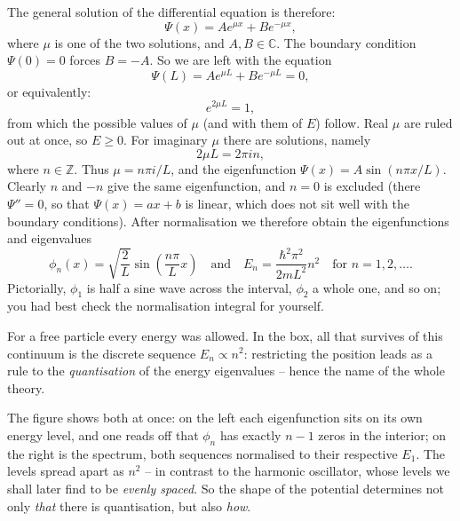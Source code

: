 The general solution of the differential equation is therefore: 
\begin{equation}
	\Psi(x) = A e^{\mu x} + B e^{-\mu x},
\end{equation}
where $\mu$ is one of the two solutions, and $A,B \in \mathbb{C}$. The boundary condition $\Psi(0)= 0$ forces $B = -A$. So we are left with the equation 
\begin{equation}
	\Psi(L) =A e^{\mu L} + B e^{-\mu L} = 0,
\end{equation}
or equivalently: 
\begin{equation}
	e^{2\mu L} = 1,
\end{equation}
from which the possible values of $\mu$ (and with them of $E$) follow. Real $\mu$ are ruled out at once,
so $E \ge 0$. For imaginary $\mu$ there are solutions, namely 
\begin{equation}
	2\mu L = 2\pi i n,
\end{equation}
where $n \in \mathbb{Z}$. Thus $\mu = n\pi i/L$, and the eigenfunction $\Psi(x) = A \sin(n\pi x/L)$.
Clearly $n$ and $-n$ give the same eigenfunction, and $n = 0$ is excluded (there $\Psi'' =0$, so that $
\Psi(x) = ax+b$ is linear, which does not sit well with the boundary conditions). After normalisation we therefore obtain the eigenfunctions and eigenvalues
\begin{equation}
	\phi_n(x) = \sqrt{\frac{2}{L}}\sin\left(\frac{n\pi}{L} x\right)\quad \text{and}\quad E_n = \frac{\hbar^2 \pi^2}{2mL^2}n^2\quad \text{for $n=1,2,\ldots$.}
\end{equation}
Pictorially, $\phi_1$ is half a sine wave across the interval, $\phi_2$ a whole one, and so on; you had best check the normalisation integral for yourself.

\begin{merksatz}
	For a free particle every energy was allowed. In the box, all that survives of this continuum is the discrete sequence $E_n\propto n^2$: restricting the position leads as a rule to the \emph{quantisation} of the energy eigenvalues -- hence the name of the whole theory.
\end{merksatz}



The figure shows both at once: on the left each eigenfunction sits on its own
energy level, and one reads off that $\phi_n$ has exactly $n-1$ zeros in the
interior; on the right is the spectrum, both sequences normalised to their
respective $E_1$. The levels spread apart as $n^2$ -- in contrast to the
harmonic oscillator, whose levels we shall later find to be
\emph{evenly spaced}. So the shape of the potential determines not only
\emph{that} there is quantisation, but also \emph{how}.

